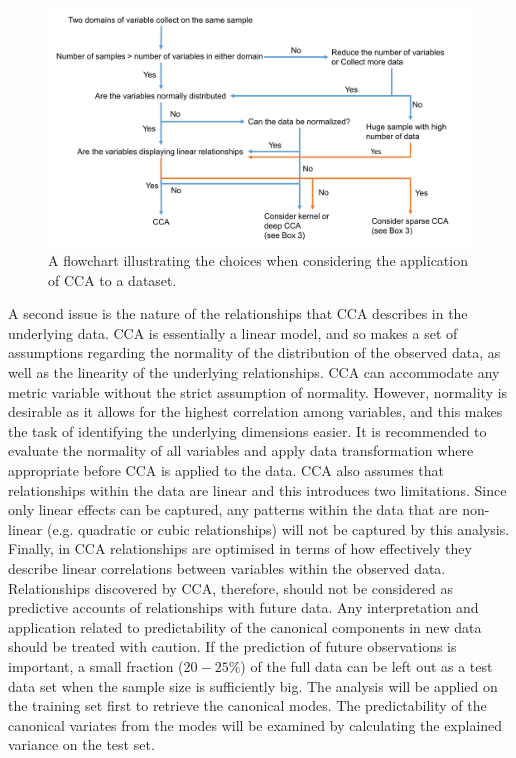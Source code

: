 \begin{figure}[H]
    \centering
    \includegraphics[width=1\textwidth]{cca/image/ccafig4.png}
    \caption{A flowchart illustrating the choices when considering the application of CCA to a dataset.}
    \label{fig:methods:fig4}
\end{figure}

A second issue is the nature of the relationships that CCA describes in the underlying data. CCA is essentially a linear model, and so makes a set of assumptions regarding the normality of the distribution of the observed data, as well as the linearity of the underlying relationships. CCA can accommodate any metric variable without the strict assumption of normality. However, normality is desirable as it allows for the highest correlation among variables, and this makes the task of identifying the underlying dimensions easier. It is recommended to evaluate the normality of all variables and apply data transformation where appropriate before CCA is applied to the data. CCA also assumes that relationships within the data are linear and this introduces two limitations. Since only linear effects can be captured, any patterns within the data that are non-linear (e.g. quadratic or cubic relationships) will not be captured by this analysis. Finally, in CCA relationships are optimised in terms of how effectively they describe linear correlations between variables within the observed data. Relationships discovered by CCA, therefore, should not be considered as predictive accounts of relationships with future data. Any interpretation and application related to predictability of the canonical components in new data should be treated with caution. If the prediction of future observations is important, a small fraction ($20-25\%$) of the full data can be left out as a test data set when the sample size is sufficiently big. The analysis will be applied on the training set first to retrieve the canonical modes. The predictability of the canonical variates from the modes will be examined by calculating the explained variance on the test set.  


